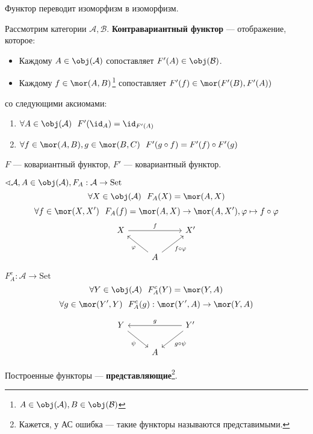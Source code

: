 \begin{lemma}
    Функтор переводит изоморфизм в изоморфизм.
\end{lemma}

\begin{definition}
    Рассмотрим категории \(\mathcal{A}, \mathcal{B}\). \textbf{Контравариантный функтор} --- отображение, которое:
    \begin{itemize}
        \item Каждому \(A \in \obj(\mathcal{A})\) сопоставляет \(F'(A) \in \obj(\mathcal{B})\).
        \item Каждому \(f \in \mor(A, B)\)\footnote{\(A \in \obj(\mathcal{A}), B \in \obj(\mathcal{B})\)} сопоставляет \(F'(f) \in \mor(F'(B), F'(A))\)
    \end{itemize}
    со следующими аксиомами:
    \begin{enumerate}
        \item \(\forall A \in \obj(\mathcal{A}) \ \ F'(\id_A) = \id_{F'(A)}\)
        \item \(\forall f \in \mor(A, B), g \in \mor(B, C) \ \ F'(g \circ f) = F'(f) \circ F'(g)\)
    \end{enumerate}
\end{definition}

\begin{notation}
    \(F\) --- ковариантный функтор, \(F'\) --- ковариантный функтор.
\end{notation}

\(\sphericalangle \mathcal{A}, A \in \obj(\mathcal{A}), F_A : \mathcal{A} \to \mathrm{Set}\)
\[\forall X \in \obj(\mathcal{A}) \ \ F_A(X) = \mor(A, X)\]
\[\forall f \in \mor(X, X') \ \ F_A(f) = \mor (A, X) \to \mor(A, X'), \varphi \mapsto f \circ \varphi\]
\[\begin{tikzcd}
        X \arrow{rr}{f} & & X' \\
        & A \arrow{ul}{\varphi} \arrow[swap]{ur}{f \circ \varphi} &
    \end{tikzcd}\]

\(F_A^c : \mathcal{A} \to \mathrm{Set}\)
\[\forall Y \in \obj(\mathcal{A}) \ \ F_A^c(Y) = \mor(Y, A)\]
\[\forall g \in \mor(Y', Y) \ \ F_A^c(g) : \mor(Y', A) \to \mor(Y, A)\]

\[\begin{tikzcd}
        Y \arrow[swap]{dr}{\psi} & & Y' \arrow[swap]{ll}{g} \arrow{dl}{g \circ \psi} \\
        & A &
    \end{tikzcd}\]

Построенные функторы --- \textbf{представляющие}\footnote{Кажется, у АС ошибка --- такие функторы называются представимыми.}.
